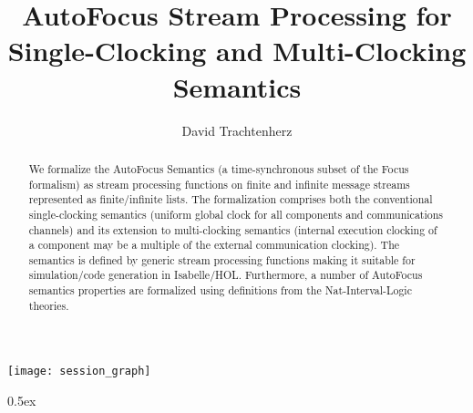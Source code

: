 \documentclass[11pt,a4paper]{article}
\begin{document}
\title{AutoFocus Stream Processing for Single-Clocking and Multi-Clocking Semantics}
\author{David Trachtenherz}
\maketitle

\begin{abstract}
We formalize the AutoFocus Semantics (a time-synchronous subset of the
Focus formalism) as stream processing functions on finite and infinite
message streams represented as finite/infinite lists. The
formalization comprises both the conventional single-clocking
semantics (uniform global clock for all components and communications
channels) and its extension to multi-clocking semantics (internal
execution clocking of a component may be a multiple of the external
communication clocking). The semantics is defined by generic stream
processing functions making it suitable for simulation/code generation
in Isabelle/HOL. Furthermore, a number of AutoFocus semantics
properties are formalized using definitions from the Nat-Interval-Logic
theories.
\end{abstract}

\tableofcontents

\begin{center}
  \texttt{[image: session\_graph]}
\end{center}

\clearpage

\renewcommand{\isamarkupheader}[1]%
{\section{\isabellecontext: #1}\markright{THEORY~``\isabellecontext''}}

\parindent 0pt\parskip 0.5ex

\end{document}
